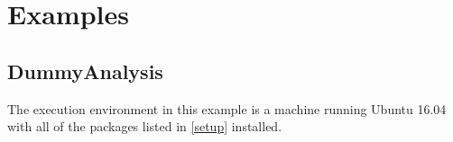 







%        


\chapter{Examples}

\section{DummyAnalysis}

The execution environment in this example is a machine running Ubuntu 16.04 with all of the packages listed in \autoref{setup} installed. 

